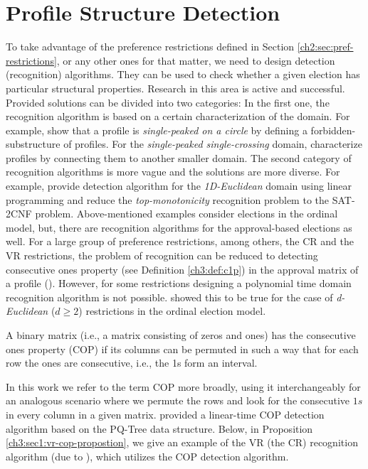 \section{Profile Structure Detection}\label{ch3:sec1:detection}
To take advantage of the preference restrictions defined in Section \ref{ch2:sec:pref-restrictions}, or any other ones for that matter,
we need to design detection (recognition) algorithms. They can be used to check whether a given election
has particular structural properties. 
Research in this area is active and successful.
Provided solutions can be divided into two categories:
In the first one, the recognition algorithm is based on a certain characterization of the domain.
For example, \cite{peters-spoc} show that a profile is \textit{single-peaked on a circle} by defining a forbidden-substructure of profiles.  
For the \textit{single-peaked single-crossing} domain,
\cite{elkind-recognising-spsc} characterize profiles by connecting them to another smaller domain.
The second category of recognition algorithms is more vague and the solutions are more diverse. 
For example, \cite{doigon-recognising-1deuclidean} provide detection algorithm for the \textit{1D-Euclidean} domain using linear programming and
\cite{magiera-recognising-topmono} reduce the \textit{top-monotonicity} recognition problem to the SAT-2CNF problem.
Above-mentioned examples consider elections in the ordinal model,
but, there are recognition algorithms for the approval-based elections as well.
For a large group of preference restrictions, among others, the CR and the VR restrictions,
the problem of recognition can be reduced to detecting consecutive ones property (see Definition \ref{ch3:def:c1p})
in the approval matrix of a profile (\cite{elkind-approval-restrictions}).
However, for some restrictions designing a polynomial time domain recognition algorithm is not possible.
\cite{peters-recognising-euc-pref} showed this to be true for the case of \textit{d-Euclidean} ($d \geq 2$) restrictions in the ordinal election model.

\begin{definition}\label{ch3:def:c1p}
A binary matrix (i.e., a matrix consisting of zeros and ones) has the consecutive ones property (COP)
if its columns can be permuted in such a way that
for each row the ones are consecutive, i.e., the 1s form an interval.
\end{definition}

In this work we refer to the term COP more broadly, using it interchangeably
for an analogous scenario where we permute the rows and look for the 
consecutive $1s$ in every column in a given matrix.
\cite{COP-PQTree} provided a linear-time COP detection algorithm based on the PQ-Tree data structure.
Below, in Proposition \ref{ch3:sec1:vr-cop-propostion}, we give an example of the VR (the CR) recognition algorithm (due to \cite{elkind-approval-restrictions}),
which utilizes the COP detection algorithm. 

